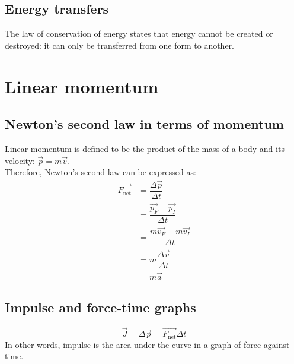 \documentclass[a4paper,12pt]{article}
\begin{document}
\subsection{Energy transfers}
The law of conservation of energy states that energy cannot be created or destroyed: it can only be transferred from one form to another.
\section{Linear momentum}
\subsection{Newton's second law in terms of momentum}
Linear momentum is defined to be the product of the mass of a body and its velocity: \(\vec{p}=m\vec{v}\).\\
Therefore, Newton's second law can be expressed as:
$$\begin{aligned}\vec{F_\text{net}}&=\dfrac{\Delta \vec{p}}{\Delta t}\\&=\dfrac{\vec{p_F}-\vec{p_I}}{\Delta t}\\&=\dfrac{m\vec{v_F}-m\vec{v_I}}{\Delta t}\\&=m\dfrac{\Delta \vec{v}}{\Delta t}\\&=m\vec{a}\end{aligned}$$
\subsection{Impulse and force-time graphs}
\[\vec{J}=\Delta \vec{p}=\vec{F_\text{net}}\Delta t\]
In other words, impulse is the area under the curve in a graph of force against time.
\end{document}
